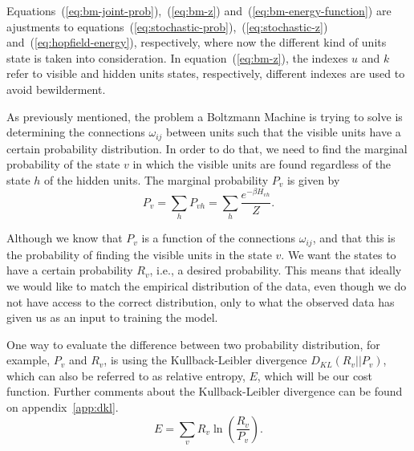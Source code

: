 Equations~(\ref{eq:bm-joint-prob}),~(\ref{eq:bm-z}) and~(\ref{eq:bm-energy-function}) are ajustments to equations~(\ref{eq:stochastic-prob}),~(\ref{eq:stochastic-z}) and~(\ref{eq:hopfield-energy}), respectively, where now the different kind of units state is taken into consideration. 
In equation~(\ref{eq:bm-z}), the indexes $u$ and $k$ refer to visible and hidden units states, respectively, different indexes are used to avoid bewilderment.

As previously mentioned, the problem a Boltzmann Machine is trying to solve is determining the connections $\omega_{ij}$ between units such that the visible units have a certain probability distribution. 
In order to do that, we need to find the marginal probability of the state $v$ in which the visible units are found regardless of the state $h$ of the hidden units. The marginal probability $P_{v}$ is given by
\begin{equation}
  \label{eq:bm-marginal-prob}
  P_{v} = \sum_{h} P_{vh} = \sum_{h} \frac{e^{-\beta H_{vh}}}{Z}.
\end{equation}

Although we know that $P_{v}$ is a function of the connections $\omega_{ij}$, and that this is the probability of finding the visible units in the state $v$. We want the states to have a certain probability $R_{v}$, i.e., a desired probability.
This means that ideally we would like to match the empirical distribution of the data, even though we do not have access to the correct distribution, only to what the observed data has given us as an input to training the model.

One way to evaluate the difference between two probability distribution, for example, $P_{v}$ and $R_{v}$, is using the Kullback-Leibler divergence $D_{KL}(R_{v}||P_{v})$, which can also be referred to as relative entropy, $E$, which will be our cost function. 
Further comments about the Kullback-Leibler divergence can be found on appendix~\ref{app:dkl}.
\begin{equation}
  \label{eq:relative-entropy}
  E = \sum_{v} R_{v} \ln{\left(\frac{R_{v}}{P_{v}}\right)}.
\end{equation}

